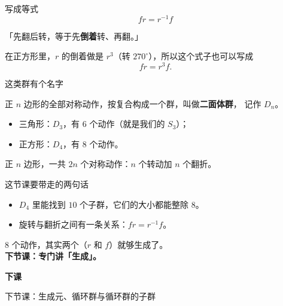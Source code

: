 \documentclass[10pt]{beamer}
\begin{document}
\begin{frame}{写成等式}
  \[
    fr = r^{-1}f
  \]
  \pause
  \begin{center}
    {\large 「先翻后转，等于先\textbf{倒着}转、再翻。」}
  \end{center}
  \pause
  在正方形里，\(r\) 的倒着做是 \(r^3\)（转 \(270^\circ\)），所以这个式子也可以写成
  \[
    fr=r^3f .
  \]
\end{frame}

\begin{frame}{这类群有个名字}
  \begin{definition}[二面体群]
    正 \(n\) 边形的全部对称动作，按复合构成一个群，叫做\textbf{二面体群}，
    记作 \(D_n\)。
  \end{definition}
  \pause
  \begin{itemize}
    \item 三角形：\(D_3\)，有 \(6\) 个动作（就是我们的 \(S_3\)）；
    \item 正方形：\(D_4\)，有 \(8\) 个动作。
  \end{itemize}
  \pause
  \begin{center}
    {\large 正 \(n\) 边形，一共 \(2n\) 个对称动作：\(n\) 个转动加 \(n\) 个翻折。}
  \end{center}
\end{frame}

\begin{frame}{这节课要带走的两句话}
  \begin{itemize}
    \item \(D_4\) 里能找到 \(10\) 个子群，它们的大小都能整除 \(8\)。
    \item 旋转与翻折之间有一条关系：\(fr=r^{-1}f\)。
  \end{itemize}
  \pause
  \begin{center}
    {\large \(8\) 个动作，其实两个（\(r\) 和 \(f\)）就够生成了。}\\[0.6em]
    {\large\textcolor{textgreen}{\bfseries 下节课：专门讲「生成」。}}
  \end{center}
\end{frame}

\begin{frame}
  \begin{center}
    \vspace{1.6cm}
    {\Large\textcolor{textgreen}{\bfseries 下课}}

    \vspace{1.0cm}
    {\large\textcolor{accentgreen}{下节课：生成元、循环群与循环群的子群}}
  \end{center}
\end{frame}
\end{document}

